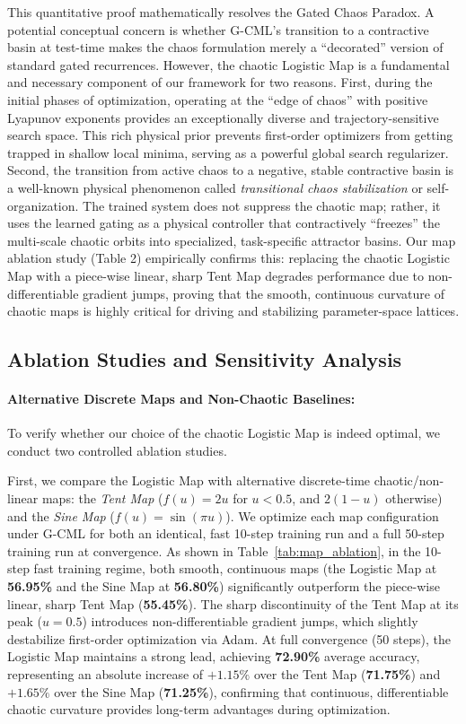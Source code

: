 This quantitative proof mathematically resolves the Gated Chaos Paradox. A potential conceptual concern is whether G-CML's transition to a contractive basin at test-time makes the chaos formulation merely a ``decorated'' version of standard gated recurrences. However, the chaotic Logistic Map is a fundamental and necessary component of our framework for two reasons. First, during the initial phases of optimization, operating at the ``edge of chaos'' with positive Lyapunov exponents provides an exceptionally diverse and trajectory-sensitive search space. This rich physical prior prevents first-order optimizers from getting trapped in shallow local minima, serving as a powerful global search regularizer. Second, the transition from active chaos to a negative, stable contractive basin is a well-known physical phenomenon called \emph{transitional chaos stabilization} or self-organization. The trained system does not suppress the chaotic map; rather, it uses the learned gating as a physical controller that contractively ``freezes'' the multi-scale chaotic orbits into specialized, task-specific attractor basins. Our map ablation study (Table 2) empirically confirms this: replacing the chaotic Logistic Map with a piece-wise linear, sharp Tent Map degrades performance due to non-differentiable gradient jumps, proving that the smooth, continuous curvature of chaotic maps is highly critical for driving and stabilizing parameter-space lattices.

\subsection{Ablation Studies and Sensitivity Analysis}
\label{subsec:ablations}

\paragraph{Alternative Discrete Maps and Non-Chaotic Baselines:}
To verify whether our choice of the chaotic Logistic Map is indeed optimal, we conduct two controlled ablation studies. 

First, we compare the Logistic Map with alternative discrete-time chaotic/non-linear maps: the \emph{Tent Map} ($f(u) = 2u$ for $u < 0.5$, and $2(1-u)$ otherwise) and the \emph{Sine Map} ($f(u) = \sin(\pi u)$). We optimize each map configuration under G-CML for both an identical, fast 10-step training run and a full 50-step training run at convergence. As shown in Table~\ref{tab:map_ablation}, in the 10-step fast training regime, both smooth, continuous maps (the Logistic Map at \textbf{56.95\%} and the Sine Map at \textbf{56.80\%}) significantly outperform the piece-wise linear, sharp Tent Map (\textbf{55.45\%}). The sharp discontinuity of the Tent Map at its peak ($u = 0.5$) introduces non-differentiable gradient jumps, which slightly destabilize first-order optimization via Adam. At full convergence (50 steps), the Logistic Map maintains a strong lead, achieving \textbf{72.90\%} average accuracy, representing an absolute increase of $+1.15\%$ over the Tent Map (\textbf{71.75\%}) and $+1.65\%$ over the Sine Map (\textbf{71.25\%}), confirming that continuous, differentiable chaotic curvature provides long-term advantages during optimization.

